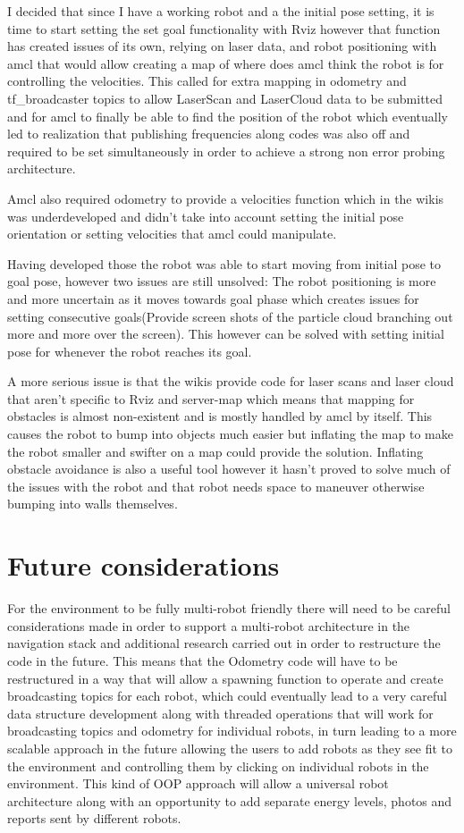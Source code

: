 \documentclass{report}
\begin{document}
    I decided that since I have a working robot and a the initial pose setting, it is time to start setting the set goal functionality with Rviz however that function has created issues of its own, relying on laser data\cite{LaserScan}, and robot positioning with amcl\cite{amcl} that would allow creating a map of where does amcl think the robot is for controlling the velocities. This called for extra mapping in odometry and tf\_broadcaster topics to allow LaserScan and LaserCloud data to be submitted and for amcl to finally be able to find the position of the robot which eventually led to realization that publishing frequencies along codes was also off and required to be set simultaneously in order to achieve a strong non error probing architecture.

    Amcl also required odometry to provide a velocities function which in the wikis was underdeveloped and didn't take into account setting the initial pose orientation or setting velocities that amcl could manipulate.

    Having developed those the robot was able to start moving from initial pose to goal pose, however two issues are still unsolved: The robot positioning is more and more uncertain as it moves towards goal phase which creates issues for setting consecutive goals(Provide screen shots of the particle cloud branching out more and more over the screen). This however can be solved with setting initial pose for whenever the robot reaches its goal.

    A more serious issue is that the wikis provide code for laser scans and laser cloud that aren't specific to Rviz and server-map which means that mapping for obstacles is almost non-existent and is mostly handled by amcl by itself. This causes the robot to bump into objects much easier but inflating the map to make the robot smaller and swifter on a map could provide the solution. Inflating obstacle avoidance is also a useful tool however it hasn't proved to solve much of the issues with the robot and that robot needs space to maneuver otherwise bumping into walls themselves.

    \section{Future considerations}
    For the environment to be fully multi-robot friendly there will need to be careful considerations made in order to support a multi-robot architecture in the navigation stack and additional research carried out in order to restructure the code in the future. This means that the Odometry code will have to be restructured in a way that will allow a spawning function to operate and create broadcasting topics for each robot, which could eventually lead to a very careful data structure development along with threaded operations that will work for broadcasting topics and odometry for individual robots, in turn leading to a more scalable approach in the future allowing the users to add robots as they see fit to the environment and controlling them by clicking on individual robots in the environment. This kind of OOP approach will allow a universal robot architecture along with an opportunity to add separate energy levels, photos and reports sent by different robots.
\end{document}
